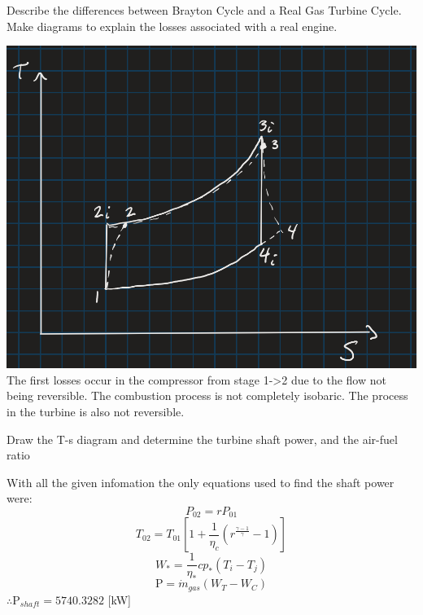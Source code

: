 \documentclass[12pt]{exam}
\begin{document}
\begin{questions}
\newpage 
\begin{question}
Describe the differences between Brayton Cycle and a Real Gas Turbine Cycle. Make
diagrams to explain the losses associated with a real engine.
\end{question}
\begin{solutionorbox}[\stretch{1}]
\[\]
\includegraphics[width=\linewidth]{brayton v real cycle.png}
The first losses occur in the compressor from stage 1->2 due to the 
flow not being reversible. The combustion process is not completely isobaric.
The process in the turbine is also not reversible.
\end{solutionorbox}


\newpage 
\begin{question}
Draw the T-s diagram and determine the turbine shaft power, and the air-fuel ratio
\end{question}
\begin{solutionorbox}[\stretch{1}]
With all the given infomation the only equations used to find the shaft power were:
\[P_{02} = rP_{01}\]
\[T_{02} = T_{01}\left[1 + \frac{1}{\eta_c}\left(r^\frac{\gamma-1}{\gamma} - 1\right)\right]\]
\[W_* = \frac{1}{\eta_*}cp_*(T_i - T_j)\]
\[\text{P} = \dot{m}_{gas}(W_T - W_C)\]
\(\therefore \text{P}_{shaft} = 5740.3282\) [kW] 


\end{solutionorbox}
\end{questions}
\end{document}
